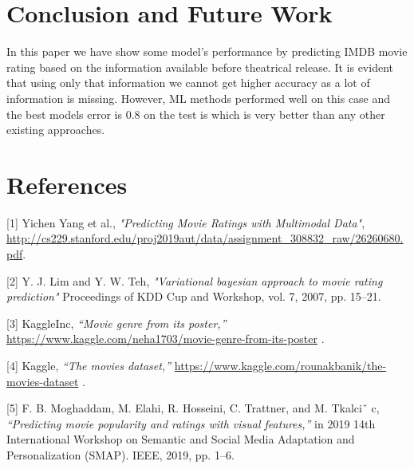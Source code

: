 \documentclass{article}
\begin{document}
\section{Conclusion and Future Work}

In this paper we have show some model's performance by predicting IMDB movie rating based on the information available before theatrical release. It is evident that using only that information we cannot get higher accuracy as a lot of information is missing. However, ML methods performed well on this case and the best models error is 0.8 on the test is which is very better than any other existing approaches. 

\section*{References}
\label{reference}

\small

[1] Yichen Yang et al., {\it "Predicting Movie Ratings with Multimodal Data"},
\url{http://cs229.stanford.edu/proj2019aut/data/assignment_308832_raw/26260680.pdf}.

[2] Y. J. Lim and Y. W. Teh, {\it "Variational bayesian approach to movie rating prediction"}  Proceedings of KDD Cup and Workshop, vol. 7, 2007, pp. 15–21.

[3] KaggleInc, {\it “Movie genre from its poster,”} 
\url{https://www.kaggle.com/neha1703/movie-genre-from-its-poster} .

[4] Kaggle, {\it “The movies dataset,” } \url{https://www.kaggle.com/rounakbanik/the-movies-dataset} .

[5] F. B. Moghaddam, M. Elahi, R. Hosseini, C. Trattner, and M. Tkalciˇ c, {\it“Predicting movie popularity and ratings with visual features,” } in 2019 14th International Workshop on Semantic and Social Media Adaptation and Personalization (SMAP). IEEE, 2019, pp. 1–6.
\end{document}
